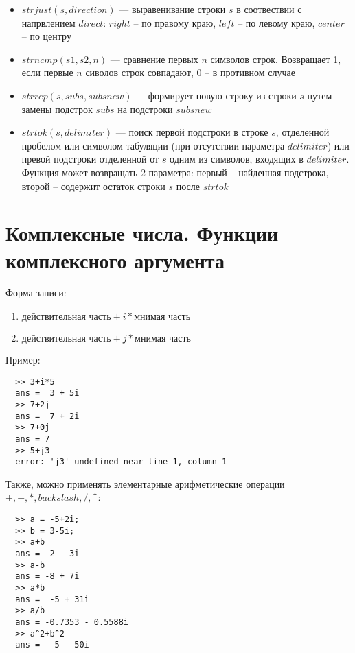 \documentclass[12pt, a4paper,oneside]{book}
\begin{document}
\begin{itemize}
  \item{$strjust(s, direction)$ --- выравенивание строки $s$ в соотвествии с напрвлением $direct$: $right$ -- по правому краю, $left$ -- по левому краю, $center$ -- по центру}
  \item{$strncmp(s1, s2, n)$ --- сравнение первых $n$ символов строк. Возвращает 1, если первые $n$ сиволов строк совпадают, 0 -- в противном случае}
  \item{$strrep(s, subs, subsnew)$ --- формирует новую строку из строки $s$ путем замены подстрок $subs$ на подстроки $subsnew$}
  \item{$strtok(s, delimiter)$ --- поиск первой подстроки в строке $s$, отделенной пробелом или символом табуляции (при отсутствии параметра $delimiter$) или превой подстроки отделенной от $s$ одним из символов, входящих в $delimiter$. Функция может возвращать 2 параметра: первый -- найденная подстрока, второй -- содержит остаток строки $s$ после $strtok$}

\end{itemize}

\section{Комплексные числа. Функции комплексного аргумента}
Форма записи:
\begin{enumerate}
  \item{$\text{действительная часть} + i * \text{мнимая часть}$}
  \item{$\text{действительная часть} + j * \text{мнимая часть}$}
\end{enumerate}
Пример:
\begin{lstlisting}
  >> 3+i*5
  ans =  3 + 5i
  >> 7+2j
  ans =  7 + 2i
  >> 7+0j
  ans = 7
  >> 5+j3
  error: 'j3' undefined near line 1, column 1
\end{lstlisting}

Также, можно применять элементарные арифметические операции $+, -, *, backslash, /, \^$:
\begin{lstlisting}
  >> a = -5+2i;
  >> b = 3-5i;
  >> a+b
  ans = -2 - 3i
  >> a-b
  ans = -8 + 7i
  >> a*b
  ans =  -5 + 31i
  >> a/b
  ans = -0.7353 - 0.5588i
  >> a^2+b^2
  ans =   5 - 50i
\end{lstlisting}
\end{document}
